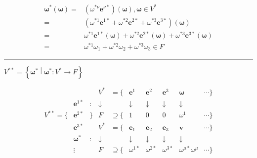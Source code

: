 \documentclass[
]{book}
\theoremstyle{definition}
\theoremstyle{definition}
\theoremstyle{definition}
\theoremstyle{definition}
\theoremstyle{remark}
\begin{document}
\[
\begin{aligned}
\boldsymbol{\omega}^{*}\left(\boldsymbol{\omega}\right)= & \left(\omega^{*{\scriptscriptstyle \nu}}\boldsymbol{e}^{{\scriptscriptstyle \nu}*}\right)\left(\boldsymbol{\omega}\right),\boldsymbol{\omega}\in V^{*}\\
= & \left(\omega^{*{\scriptscriptstyle 1}}\boldsymbol{e}^{{\scriptscriptstyle 1}*}+\omega^{*{\scriptscriptstyle 2}}\boldsymbol{e}^{{\scriptscriptstyle 2}*}+\omega^{*{\scriptscriptstyle 3}}\boldsymbol{e}^{{\scriptscriptstyle 3}*}\right)\left(\boldsymbol{\omega}\right)\\
= & \omega^{*{\scriptscriptstyle 1}}\boldsymbol{e}^{{\scriptscriptstyle 1}*}\left(\boldsymbol{\omega}\right)+\omega^{*{\scriptscriptstyle 2}}\boldsymbol{e}^{{\scriptscriptstyle 2}*}\left(\boldsymbol{\omega}\right)+\omega^{*{\scriptscriptstyle 3}}\boldsymbol{e}^{{\scriptscriptstyle 3}*}\left(\boldsymbol{\omega}\right)\\
= & \omega^{*{\scriptscriptstyle 1}}\omega_{{\scriptscriptstyle 1}}+\omega^{*{\scriptscriptstyle 2}}\omega_{{\scriptscriptstyle 2}}+\omega^{*{\scriptscriptstyle 3}}\omega_{{\scriptscriptstyle 3}}\in F
\end{aligned}
\]

\begin{center}\rule{0.5\linewidth}{0.5pt}\end{center}

\(V^{**}=\left\{ \boldsymbol{\omega}^{*}\middle|\boldsymbol{\omega}^{*}:V^{*}\rightarrow F\right\}\)

\[
\begin{array}{cccccccccc}
 &  &  & V^{*} & =\{ & \boldsymbol{e}^{{\scriptscriptstyle 1}} & \boldsymbol{e}^{{\scriptscriptstyle 2}} & \boldsymbol{e}^{{\scriptscriptstyle 3}} & \boldsymbol{\omega} & \cdots\}\\
 & \boldsymbol{e}^{{\scriptscriptstyle 1}*} & : & \downarrow &  & \downarrow & \downarrow & \downarrow & \downarrow\\
V^{**}=\{ & \boldsymbol{e}^{{\scriptscriptstyle 2}*} & \} & F & \supseteq\{ & 1 & 0 & 0 & \omega^{{\scriptscriptstyle 1}} & \cdots\}\\
 & \boldsymbol{e}^{{\scriptscriptstyle 3}*} &  & V^{*} & =\{ & \boldsymbol{e}_{{\scriptscriptstyle 1}} & \boldsymbol{e}_{{\scriptscriptstyle 2}} & \boldsymbol{e}_{{\scriptscriptstyle 3}} & \boldsymbol{v} & \cdots\}\\
 & \boldsymbol{\omega}^{*} & : & \downarrow &  & \downarrow & \downarrow & \downarrow & \downarrow\\
 & \vdots &  & F & \supseteq\{ & \omega^{{\scriptscriptstyle 1}*} & \omega^{{\scriptscriptstyle 2}*} & \omega^{{\scriptscriptstyle 3}*} & \omega^{{\scriptscriptstyle \mu}*}\omega^{{\scriptscriptstyle \mu}} & \cdots\}
\end{array}
\]
\end{document}
